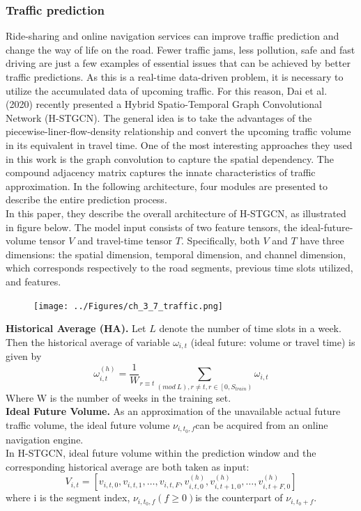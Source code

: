 \subsubsection{Traffic prediction}
Ride-sharing and online navigation services can improve traffic prediction and change the way of life on the road. Fewer traffic jams, less pollution, safe and fast driving are just a few examples of essential issues that can be achieved by better traffic predictions. As this is a real-time data-driven problem, it is necessary to utilize the accumulated data of upcoming traffic. For this reason, Dai et al. (2020) recently presented a Hybrid Spatio-Temporal Graph Convolutional Network (H-STGCN). The general idea is to take the advantages of the piecewise-liner-flow-density relationship and convert the upcoming traffic volume in its equivalent in travel time. One of the most interesting approaches they used in this work is the graph convolution to capture the spatial dependency. The compound adjacency matrix captures the innate characteristics of traffic approximation. In the following architecture, four modules are presented to describe the entire prediction process.\\
In this paper, they describe the overall architecture of H-STGCN, as illustrated in figure below. The model input consists of two feature tensors, the ideal-future-volume tensor $V$ and travel-time tensor $T$. Specifically, both $V$  and $T$ have three dimensions: the spatial dimension, temporal dimension, and channel dimension, which corresponds respectively to the road segments, previous time slots utilized, and features.

\begin{figure}[H]
    \texttt{[image: ../Figures/ch\_3\_7\_traffic.png]}
\end{figure}
 \textbf{Historical Average (HA).}  Let $L$ denote the number of time slots in a week. Then the historical average of variable $\omega_{i,t}$ (ideal future: volume or travel time) is given by
$$\omega_{i,t}^{\left(h\right)}={\frac{1}{W}}_{r\equiv t}\sum_{\left(mod\ L\right),r\neq t,r\in\left[0,S_{train}\right)}\omega_{i,t}$$
Where W is the number of weeks in the training set. \\
\textbf{Ideal Future Volume.} As an approximation of the unavailable actual future traffic volume, the ideal future volume $\nu_{i,t_0,f}$can be acquired from an online navigation engine.\\
In H-STGCN, ideal future volume within the prediction window and the corresponding historical average are both taken as input:
$$V_{i,t}=\left[v_{i,t,0},v_{i,t,1},\ldots,v_{i,t,F},v_{i,t,0}^{\left(h\right)},v_{i,t+1,0}^{\left(h\right)},\ldots,v_{i,t+F,0}^{\left(h\right)}\right]$$
where i is the segment index, $\nu_{i,t_0,f}\left(f\geq0\right) $is the counterpart of $\nu_{i,t_0+f}$. \\

